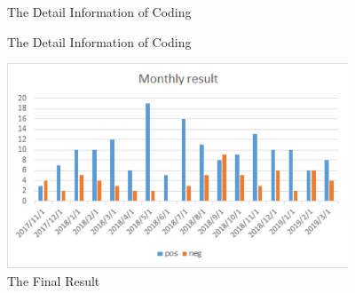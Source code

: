 \documentclass{article}
\begin{document}
\begin{figure}[htb]
	\centering
	\caption{The Detail Information of Coding}
\end{figure}
\begin{figure}[htbp]
	\centering
	\caption{The Detail Information of Coding}
\end{figure}
\begin{figure}[!h]
    \centering
    \includegraphics[width=4in]{56.png}
  	\caption{The Final Result}
\end{figure}
\end{document}
